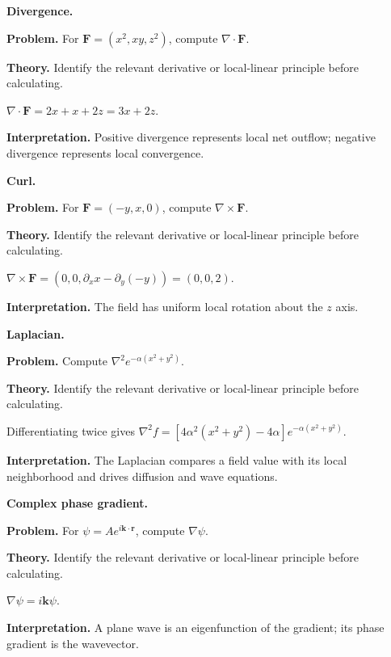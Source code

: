 \begin{workedexample}
\textbf{Divergence.}\par
\textbf{Problem.} For $\mathbf F=(x^2,xy,z^2)$, compute $\nabla\cdot\mathbf F$.

\textbf{Theory.} Identify the relevant derivative or local-linear principle before calculating.

\begin{solution}
$\nabla\cdot\mathbf F=2x+x+2z=3x+2z$.

\textbf{Interpretation.} Positive divergence represents local net outflow; negative divergence represents local convergence.
\end{solution}
\end{workedexample}

\begin{workedexample}
\textbf{Curl.}\par
\textbf{Problem.} For $\mathbf F=(-y,x,0)$, compute $\nabla\times\mathbf F$.

\textbf{Theory.} Identify the relevant derivative or local-linear principle before calculating.

\begin{solution}
$\nabla\times\mathbf F=(0,0,\partial_x x-\partial_y(-y))=(0,0,2)$.

\textbf{Interpretation.} The field has uniform local rotation about the $z$ axis.
\end{solution}
\end{workedexample}

\begin{workedexample}
\textbf{Laplacian.}\par
\textbf{Problem.} Compute $\nabla^2 e^{-\alpha(x^2+y^2)}$.

\textbf{Theory.} Identify the relevant derivative or local-linear principle before calculating.

\begin{solution}
Differentiating twice gives $\nabla^2 f=[4\alpha^2(x^2+y^2)-4\alpha]e^{-\alpha(x^2+y^2)}$.

\textbf{Interpretation.} The Laplacian compares a field value with its local neighborhood and drives diffusion and wave equations.
\end{solution}
\end{workedexample}

\begin{workedexample}
\textbf{Complex phase gradient.}\par
\textbf{Problem.} For $\psi=Ae^{i\mathbf k\cdot\mathbf r}$, compute $\nabla\psi$.

\textbf{Theory.} Identify the relevant derivative or local-linear principle before calculating.

\begin{solution}
$\nabla\psi=i\mathbf k\psi$.

\textbf{Interpretation.} A plane wave is an eigenfunction of the gradient; its phase gradient is the wavevector.
\end{solution}
\end{workedexample}


